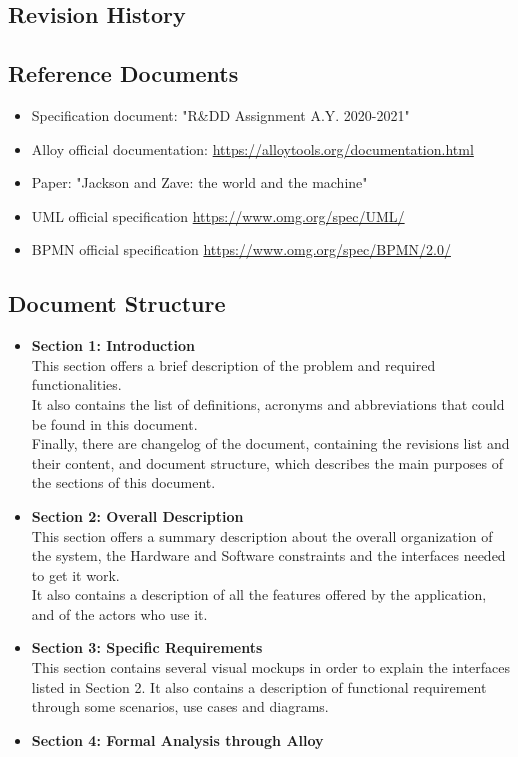 \documentclass[table, 12pt]{article}
\begin{document}
\begin{flushleft}
    \subsection{Revision History}
    \subsection{Reference Documents}
    \begin{itemize}
        \item {Specification document: "R\&DD Assignment A.Y. 2020-2021"}
        \item {Alloy official documentation: \href{https://alloytools.org/documentation.html}{https://alloytools.org/documentation.html}}
        \item {Paper: "Jackson and Zave: the world and the machine"}
        \item {UML official specification \href{https://www.omg.org/spec/UML/}{https://www.omg.org/spec/UML/}}
        \item {BPMN official specification \href{https://www.omg.org/spec/BPMN/2.0/}{https://www.omg.org/spec/BPMN/2.0/}}
    \end{itemize}
    \subsection{Document Structure}
    \begin{itemize}
        \item {\textbf{Section 1: Introduction}\\This section offers a brief description of the problem and required functionalities. \\It also contains the list of definitions, acronyms and abbreviations that could be found in this document. \\Finally, there are changelog of the document, containing the revisions list and their content, and document structure, which describes the main purposes of the sections of this document.}
        \item {\textbf{Section 2: Overall Description}\\This section offers a summary description about the overall organization of the system, the Hardware and Software constraints and the interfaces needed to get it work.\\It also contains a description of all the features offered by the application, and of the actors who use it.}
        \item {\textbf{Section 3: Specific Requirements}\\This section contains several visual mockups in order to explain the interfaces listed in Section 2. It also contains a description of functional requirement through some scenarios, use cases and diagrams.}
        \item {\textbf{Section 4: Formal Analysis through Alloy}}
    \end{itemize}
    \newpage

\end{flushleft}
\end{document}
